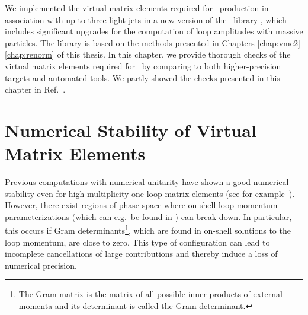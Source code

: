 We implemented the virtual matrix elements required for
\Wbb~production in association with up to three light jets in a new
version of the \BlackHat~library \cite{Berger:2008sj}, which includes significant
upgrades for the computation of loop amplitudes with massive
particles. The library is based on the methods
presented in Chapters \ref{chap:vme2}-\ref{chap:renorm} of this
thesis. In this chapter, we provide thorough checks of the virtual
matrix elements required for \mbox{\Wbbn}~by comparing to both higher-precision targets and
automated tools. We partly showed the checks presented in this chapter
in Ref.~\cite{wbbpaper}.



\section{Numerical Stability of Virtual Matrix Elements}
\label{sec:numstab}

Previous computations with numerical unitarity have shown a good numerical stability even for high-multiplicity one-loop matrix elements (see for
example~\cite{BH:W3jDistributions,BH:W5j}). However, there exist
regions of phase space where on-shell loop-momentum parameterizations (which can e.g.~be found in \cite{Kilgore2007}) can break down. In particular, this occurs if Gram determinants\footnote{The Gram matrix is the matrix of all possible inner products of external momenta and its determinant is called the Gram determinant.}, which are found in on-shell solutions to the loop momentum, are
close to zero. This type of configuration can lead to incomplete cancellations of large contributions and
thereby induce a loss of numerical precision. 





